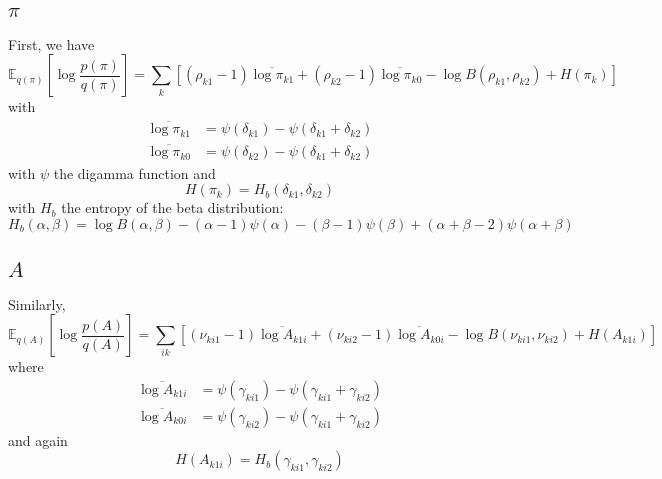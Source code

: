 \documentclass[11pt]{article}
\begin{document}
\subsection{$\pi$}
First, we have
\begin{equation}
    \mathbb{E}_{q(\pi)} \left[\log \frac{p(\pi)}{q(\pi)} \right] = \sum_k \left[(\rho_{k1} - 1)\overline{\log \pi_{k1}} + (\rho_{k2} - 1) \overline{\log \pi_{k0}} - \log B(\rho_{k1}, \rho_{k2}) + H(\pi_k) \right]
\end{equation}
with
\begin{align}
    \overline{\log \pi_{k1}} &= \psi(\delta_{k1}) - \psi(\delta_{k1} + \delta_{k2}) \\
    \overline{\log \pi_{k0}} &= \psi(\delta_{k2}) - \psi(\delta_{k1} + \delta_{k2})
\end{align}
with $\psi$ the digamma function and
\begin{equation}
    H(\pi_k) = H_b(\delta_{k1}, \delta_{k2})
\end{equation}
with $H_b$ the entropy of the beta distribution:
\begin{equation}
    H_b(\alpha, \beta) = \log B(\alpha, \beta) - (\alpha - 1) \psi(\alpha) - (\beta - 1) \psi(\beta) + (\alpha + \beta - 2)\psi(\alpha + \beta)
\end{equation}

\subsection{$A$}
Similarly,
\begin{equation}
    \mathbb{E}_{q(A)} \left[\log \frac{p(A)}{q(A)} \right] =
\sum_{ik} \left[ (\nu_{ki1} - 1) \overline{\log A_{k1i}} + (\nu_{ki2} - 1) \overline{\log A_{k0i}} - \log B(\nu_{ki1}, \nu_{ki2}) + H(A_{k1i}) \right]
\end{equation}
where
\begin{align}
    \overline{\log A_{k1i}} &= \psi(\gamma_{ki1}) - \psi(\gamma_{ki1} + \gamma_{ki2}) \\
    \overline{\log A_{k0i}} &= \psi(\gamma_{ki2}) - \psi(\gamma_{ki1} + \gamma_{ki2})
\end{align}
and again
\begin{equation}
    H(A_{k1i}) = H_b(\gamma_{ki1}, \gamma_{ki2})
\end{equation}
\end{document}
